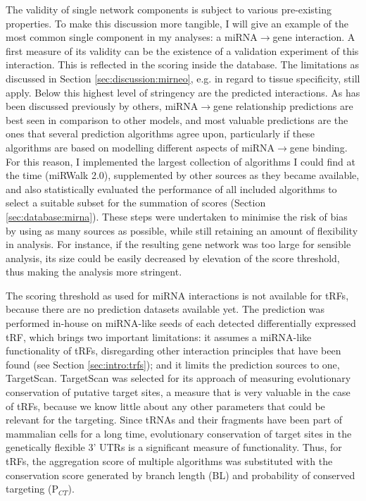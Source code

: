 The validity of single network components is subject to various pre-existing properties. To make this discussion more tangible, I will give an example of the most common single component in my analyses: a miRNA$\to$gene interaction. A first measure of its validity can be the existence of a validation experiment of this interaction. This is reflected in the scoring inside the database. The limitations as discussed in Section \ref{sec:discussion:mirneo}, e.g. in regard to tissue specificity, still apply. Below this highest level of stringency are the predicted interactions. As has been discussed previously by others, miRNA$\to$gene relationship predictions are best seen in comparison to other models, and most valuable predictions are the ones that several prediction algorithms agree upon, particularly if these algorithms are based on modelling different aspects of miRNA$\to$gene binding.\cite{Witkos2011} For this reason, I implemented the largest collection of algorithms I could find at the time (miRWalk 2.0\cite{Dweep2015}), supplemented by other sources as they became available, and also statistically evaluated the performance of all included algorithms to select a suitable subset for the summation of scores (Section \ref{sec:database:mirna}). These steps were undertaken to minimise the risk of bias by using as many sources as possible, while still retaining an amount of flexibility in analysis. For instance, if the resulting gene network was too large for sensible analysis, its size could be easily decreased by elevation of the score threshold, thus making the analysis more stringent.

The scoring threshold as used for miRNA interactions is not available for tRFs, because there are no prediction datasets available yet. The prediction was performed in-house on miRNA-like seeds of each detected differentially expressed tRF, which brings two important limitations: it assumes a miRNA-like functionality of tRFs, disregarding other interaction principles that have been found (see Section \ref{sec:intro:trfs}); and it limits the prediction sources to one, TargetScan.\cite{Friedman2009} TargetScan was selected for its approach of measuring evolutionary conservation of putative target sites, a measure that is very valuable in the case of tRFs, because we know little about any other parameters that could be relevant for the targeting. Since tRNAs and their fragments have been part of mammalian cells for a long time, evolutionary conservation of target sites in the genetically flexible 3' UTRs is a significant measure of functionality.\cite{Agarwal2015} Thus, for tRFs, the aggregation score of multiple algorithms was substituted with the conservation score generated by branch length (BL) and probability of conserved targeting (P$_{CT}$).\cite{Agarwal2015}

